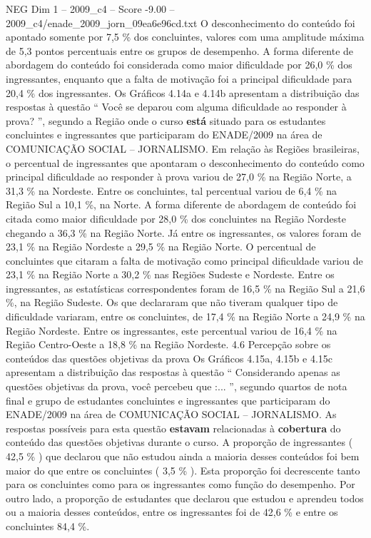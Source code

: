 \begin{textsample}{NEG Dim 1 – 2009\_c4 – Score -9.00 – 2009\_c4/enade\_2009\_jorn\_09ea6e96cd.txt}
O desconhecimento do conteúdo foi apontado somente por 7,5 \% dos concluintes, valores com uma amplitude máxima de 5,3 pontos percentuais entre os grupos de desempenho.
A forma diferente de abordagem do conteúdo foi considerada como maior dificuldade por 26,0 \% dos ingressantes, enquanto que a falta de motivação foi a principal dificuldade para 20,4 \% dos ingressantes.
Os Gráficos 4.14a e 4.14b apresentam a distribuição das respostas à questão “ Você se deparou com alguma dificuldade ao responder à prova? ”, segundo a Região onde o curso \textbf{está} situado para os estudantes concluintes e ingressantes que participaram do ENADE/2009 na área de COMUNICAÇÃO SOCIAL – JORNALISMO.
Em relação às Regiões brasileiras, o percentual de ingressantes que apontaram o desconhecimento do conteúdo como principal dificuldade ao responder à prova variou de 27,0 \% na Região Norte, a 31,3 \% na Nordeste.
Entre os concluintes, tal percentual variou de 6,4 \% na Região Sul a 10,1 \%, na Norte.
A forma diferente de abordagem de conteúdo foi citada como maior dificuldade por 28,0 \% dos concluintes na Região Nordeste chegando a 36,3 \% na Região Norte.
Já entre os ingressantes, os valores foram de 23,1 \% na Região Nordeste a 29,5 \% na Região Norte.
O percentual de concluintes que citaram a falta de motivação como principal dificuldade variou de 23,1 \% na Região Norte a 30,2 \% nas Regiões Sudeste e Nordeste.
Entre os ingressantes, as estatísticas correspondentes foram de 16,5 \% na Região Sul a 21,6 \%, na Região Sudeste.
Os que declararam que não tiveram qualquer tipo de dificuldade variaram, entre os concluintes, de 17,4 \% na Região Norte a 24,9 \% na Região Nordeste.
Entre os ingressantes, este percentual variou de 16,4 \% na Região Centro-Oeste a 18,8 \% na Região Nordeste. 4.6 Percepção sobre os conteúdos das questões objetivas da prova Os Gráficos 4.15a, 4.15b e 4.15c apresentam a distribuição das respostas à questão “ Considerando apenas as questões objetivas da prova, você percebeu que :... ”, segundo quartos de nota final e grupo de estudantes concluintes e ingressantes que participaram do ENADE/2009 na área de COMUNICAÇÃO SOCIAL – JORNALISMO.
As respostas possíveis para esta questão \textbf{estavam} relacionadas à \textbf{cobertura} do conteúdo das questões objetivas durante o curso.
A proporção de ingressantes ( 42,5 \% ) que declarou que não estudou ainda a maioria desses conteúdos foi bem maior do que entre os concluintes ( 3,5 \% ).
Esta proporção foi decrescente tanto para os concluintes como para os ingressantes como função do desempenho.
Por outro lado, a proporção de estudantes que declarou que estudou e aprendeu todos ou a maioria desses conteúdos, entre os ingressantes foi de 42,6 \% e entre os concluintes 84,4 \%.

\end{textsample}
